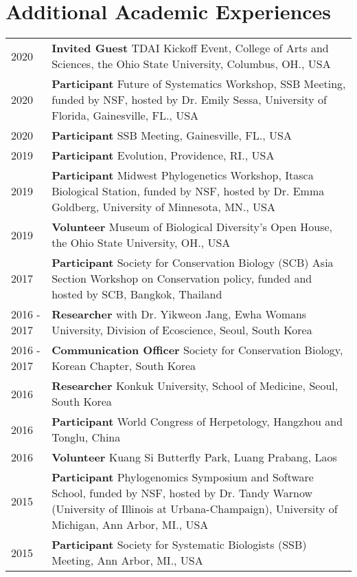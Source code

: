 \documentclass[11pt]{article}
\begin{document}
\hspace{0pt}

\section*{Additional Academic Experiences}

\begin{longtable}{p{}  p{}}

2020 &	\textbf{Invited Guest} TDAI Kickoff Event, College of Arts and Sciences, the Ohio State University, Columbus, OH., USA\\
2020 &	\textbf{Participant} Future of Systematics Workshop, SSB Meeting, funded by NSF, hosted by Dr. Emily Sessa, University of Florida, Gainesville, FL., USA\\
2020 &	\textbf{Participant} SSB Meeting, Gainesville, FL., USA\\
2019 &  \textbf{Participant} Evolution, Providence, RI., USA\\
2019 &	\textbf{Participant} Midwest Phylogenetics Workshop, Itasca Biological Station, funded by NSF, hosted by Dr. Emma Goldberg, University of Minnesota, MN., USA\\
2019 & \textbf{Volunteer} Museum of Biological Diversity’s Open House, the Ohio State University, OH., USA\\
2017 &	\textbf{Participant} Society for Conservation Biology (SCB) Asia Section Workshop on Conservation policy, funded and hosted by SCB, Bangkok, Thailand\\
2016 - 2017 & \textbf{Researcher} with Dr. Yikweon Jang, Ewha Womans University, Division of Ecoscience, Seoul, South Korea\\
2016 - 2017 &	\textbf{Communication Officer} Society for Conservation Biology, Korean Chapter, South Korea\\
2016 &	\textbf{Researcher} Konkuk University, School of Medicine, Seoul, South Korea\\
2016 &	\textbf{Participant} World Congress of Herpetology, Hangzhou and Tonglu, China\\
2016 &	\textbf{Volunteer} Kuang Si Butterfly Park, Luang Prabang, Laos\\
2015 &	\textbf{Participant} Phylogenomics Symposium and Software School, funded by NSF, hosted by Dr. Tandy Warnow (University of Illinois at Urbana-Champaign), University of Michigan, Ann Arbor, MI., USA\\
2015 &	\textbf{Participant} Society for Systematic Biologists (SSB) Meeting, Ann Arbor, MI., USA\\

\end{longtable}
\end{document}
